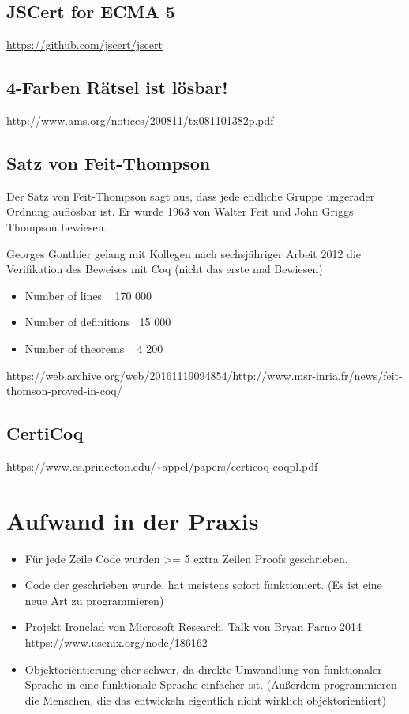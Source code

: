 \subsection{JSCert for ECMA 5}
\url{https://github.com/jscert/jscert}
\subsection{4-Farben Rätsel ist lösbar!}
\url{http://www.ams.org/notices/200811/tx081101382p.pdf}
\subsection{Satz von Feit-Thompson}
Der Satz von Feit-Thompson sagt aus, dass jede endliche Gruppe ungerader Ordnung auflösbar ist. Er wurde 1963 von Walter Feit und John Griggs Thompson bewiesen.

Georges Gonthier gelang mit Kollegen nach sechsjähriger Arbeit 2012 die Verifikation des Beweises mit Coq (nicht das erste mal Bewiesen)
\begin{itemize}
	\item Number of lines ~ 170 000
	\item Number of definitions ~15 000
	\item Number of theorems ~ 4 200
\end{itemize}
\url{https://web.archive.org/web/20161119094854/http://www.msr-inria.fr/news/feit-thomson-proved-in-coq/}
\subsection{CertiCoq}
\url{https://www.cs.princeton.edu/~appel/papers/certicoq-coqpl.pdf}

\section{Aufwand in der Praxis}
\begin{itemize}
	\item Für jede Zeile Code wurden >= 5 extra Zeilen Proofs geschrieben.
	\item Code der geschrieben wurde, hat meistens sofort funktioniert. (Es ist eine neue Art zu programmieren)
	\item Projekt Ironclad von Microsoft Research. Talk von Bryan Parno 2014 \url{https://www.usenix.org/node/186162}
	\item Objektorientierung eher schwer, da direkte Umwandlung von funktionaler Sprache in eine funktionale Sprache einfacher ist. (Außerdem programmieren die Menschen, die das entwickeln eigentlich nicht wirklich objektorientiert)
\end{itemize}


